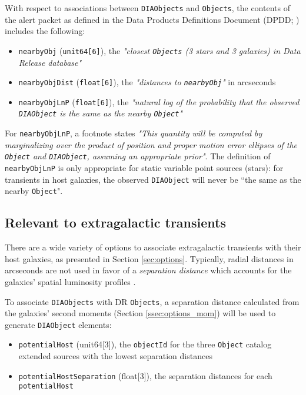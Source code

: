\documentclass[DM,authoryear,toc]{lsstdoc}
\begin{document}
With respect to associations between {\tt DIAObjects} and {\tt Objects}, the contents of the alert packet as defined in the Data Products Definitions Document (DPDD; ) includes the following:
\begin{itemize}
\item {\tt nearbyObj} ({\tt unit64[6]}), the {\it "closest {\tt Objects} (3 stars and 3 galaxies) in Data Release database"}
\item {\tt nearbyObjDist} ({\tt float[6]}), the {\it "distances to {\tt nearbyObj}"} in arcseconds
\item {\tt nearbyObjLnP} ({\tt float[6]}), the {\it "natural log of the probability that the observed {\tt DIAObject} is the same as the nearby {\tt Object}"}
\end{itemize}

For {\tt nearbyObjLnP}, a footnote states {\it "This quantity will be computed by marginalizing over the product of position and proper motion error ellipses of the {\tt Object} and {\tt DIAObject}, assuming an appropriate prior"}.
The definition of {\tt nearbyObjLnP} is only appropriate for static variable point sources (stars): for transients in host galaxies, the observed {\tt DIAObject} will never be ``the same as the nearby {\tt Object}".


\subsection{Relevant to extragalactic transients}\label{ssec:params_trans}

There are a wide variety of options to associate extragalactic transients with their host galaxies, as presented in Section \ref{sec:options}. 
Typically, radial distances in arcseconds are not used in favor of a \emph{separation distance} which accounts for the galaxies' spatial luminosity profiles \citep[e.g.,][]{2006ApJ...648..868S}.

To associate {\tt DIAObjects} with DR {\tt Objects}, a separation distance calculated from the galaxies' second moments (Section \ref{ssec:options_mom}) will be used to generate {\tt DIAObject} elements:
\begin{itemize}
\item {\tt potentialHost} (unit64[3]), the {\tt objectId} for the three {\tt Object} catalog extended sources with the lowest separation distances
\item {\tt potentialHostSeparation} (float[3]), the separation distances for each {\tt potentialHost}
\end{itemize}
\end{document}
